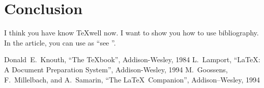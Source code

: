 \documentclass{article}                 %
\begin{document}
 \section{Conclusion}                    %
 I think you have know \TeX well now.    %
 I want to show you how to use           %
 bibliography. In the article, you       %
 can use as ``see \cite{texbook}''.      %
 \begin{thebibliography}{0}              %
  Donald~E.~Knouth, ``The \TeX book'',
 Addison-Wesley, 1984
  L.\ Lamport, ``\LaTeX:
         A Document Preparation System'',
         Addison-Wesley, 1994
  M.~Goossens, F.~Millelbach,
         and A.~Samarin, ``The \LaTeX\ Companion'',
         Addison--Wesley, 1994
 \end{thebibliography}

 
\end{document}
